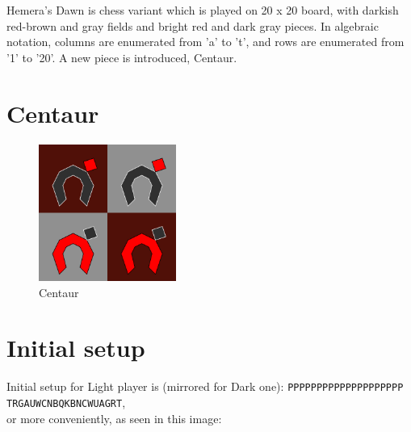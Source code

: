 \documentclass[a5paper,12pt,draft]{book} %
\begin{document}
Hemera's Dawn is chess variant which is played on 20 x 20 board, with
darkish red-brown and gray fields and bright red and dark gray pieces.
In algebraic notation, columns are enumerated from 'a' to 't', and rows
are enumerated from '1' to '20'. A new piece is introduced, Centaur.

\clearpage

\section*{Centaur}

\noindent
\begin{figure}
\includegraphics[width=0.4\textwidth, keepaspectratio=true]{../gfx/pieces/12_centaur.png}
\caption{Centaur}
\label{fig:centaur}
\end{figure}

\clearpage

\section*{Initial setup}

Initial setup for Light player is (mirrored for Dark one):
\texttt{PPPPPPPPPPPPPPPPPPPP \\
        TRGAUWCNBQKBNCWUAGRT}, \\
or more conveniently, as seen in this image:
\end{document}
